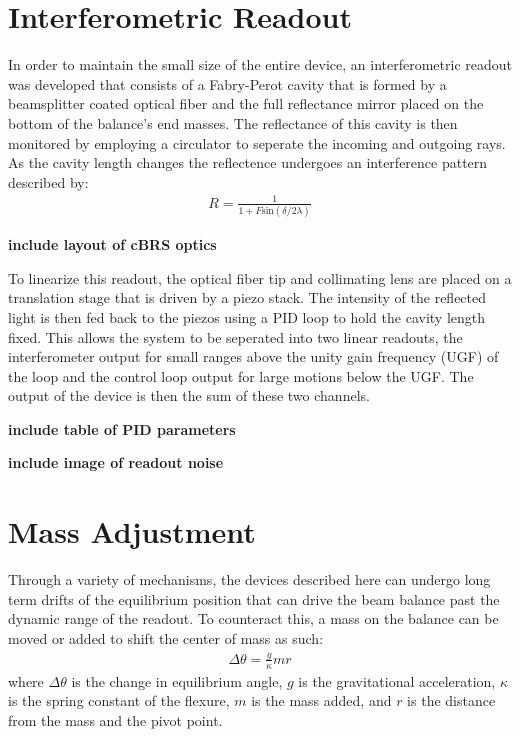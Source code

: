 \documentclass [12pt, proquest]{uwthesis}[2019]
\begin{document}
\section{Interferometric Readout}
In order to maintain the small size of the entire device, an interferometric readout was developed that consists of a Fabry-Perot cavity that is formed by a beamsplitter coated optical fiber and the full reflectance mirror placed on the bottom of the balance's end masses. The reflectance of this cavity is then monitored by employing a circulator to seperate the incoming and outgoing rays. As the cavity length changes the reflectence undergoes an interference pattern described by:
\begin{align}
R=\frac{1}{1+F \text{sin}(\delta/2 \lambda)}
\end{align}

\textbf{include layout of cBRS optics}

To linearize this readout, the optical fiber tip and collimating lens are placed on a translation stage that is driven by a piezo stack. The intensity of the reflected light is then fed back to the piezos using a PID loop to hold the cavity length fixed. This allows the system to be seperated into two linear readouts, the interferometer output for small ranges above the unity gain frequency (UGF) of the loop and the control loop output for large motions below the UGF. The output of the device is then the sum of these two channels.

\textbf{include table of PID parameters}

\textbf{include image of readout noise}

\section{Mass Adjustment}

Through a variety of mechanisms, the devices described here can undergo long term drifts of the equilibrium position that can drive the beam balance past the dynamic range of the readout. To counteract this, a mass on the balance can be moved or added to shift the center of mass as such:
\begin{align}
\Delta \theta=\frac{g}{\kappa} m r
\end{align}
where $\Delta \theta$ is the change in equilibrium angle, $g$ is the gravitational acceleration, $\kappa$ is the spring constant of the flexure, $m$ is the mass added, and $r$ is the distance from the mass and the pivot point.
\end{document}
